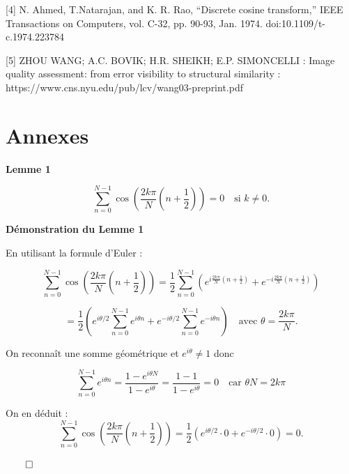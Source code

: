 \documentclass{article}
\newenvironment{myproof}[1][\proofname]{%
  \begin{proofbox}%
}{\hfill$\qed$\end{proofbox}}
\newenvironment{mydefinition}[1]{%
  \begin{definitionbox}%
  \noindent\textbf{#1}\par
}{%
  \end{definitionbox}%
}
\begin{document}
\vspace{.4cm}

[4] N. Ahmed, T.Natarajan, and K. R. Rao, “Discrete cosine transform,” IEEE Transactions on Computers, vol. C-32, pp. 90-93, Jan. 1974. doi:10.1109/t-c.1974.223784

\vspace{.4cm}

[5] ZHOU WANG; A.C. BOVIK; H.R. SHEIKH; E.P. SIMONCELLI : Image quality assessment: from error visibility to structural similarity : https://www.cns.nyu.edu/pub/lcv/wang03-preprint.pdf

\section{Annexes\label{annexe}}


\begin{mydefinition}{Lemme 1}
    \[
    \sum_{n=0}^{N-1} \cos\left(\frac{2k\pi}{N} \left(n + \frac{1}{2} \right)\right) = 0 \quad \text{si } k \neq 0.
    \]
\end{mydefinition}



\begin{myproof}
    \textbf{Démonstration du Lemme 1}

    En utilisant la formule d'Euler :
    
    \[
    \sum_{n=0}^{N-1} \cos\left(\frac{2k\pi}{N} \left(n + \frac{1}{2} \right)\right) 
    = \frac{1}{2} \sum_{n=0}^{N-1} \left( e^{i\frac{2k\pi}{N}(n + \frac{1}{2})} + e^{-i\frac{2k\pi}{N}(n + \frac{1}{2})} \right)
    \]
    
    \[
    =\frac{1}{2} \left( e^{i\theta/2} \sum_{n=0}^{N-1} e^{i\theta n} + e^{-i\theta/2} \sum_{n=0}^{N-1} e^{-i\theta n} \right) \quad \text{avec } \theta = \frac{2k\pi}{N} .
    \]
    
    
    On reconnaît une somme géométrique et \( e^{i\theta} \neq 1 \) donc
    
    \[
    \sum_{n=0}^{N-1} e^{i\theta n} = \frac{1 - e^{i\theta N}}{1 - e^{i\theta}} = \frac{1 - 1}{1 - e^{i\theta}} = 0 \quad \text{car } \theta N = 2k\pi
    \]
    
    
    On en déduit :
    \[
    \sum_{n=0}^{N-1} \cos\left(\frac{2k\pi}{N} \left(n + \frac{1}{2} \right)\right)
    = \frac{1}{2} \left( e^{i\theta/2} \cdot 0 + e^{-i\theta/2} \cdot 0 \right)
    = 0.
    \]

\end{myproof}
\end{document}
